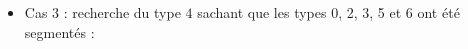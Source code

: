 

\begin{itemize}
\item Cas 3 : recherche du type $4$ sachant que les types 0, 2, 3, 5 et 6 ont été segmentés :
\end{itemize}

